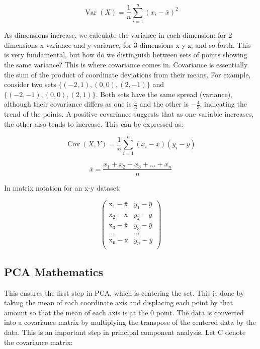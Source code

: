 \documentclass{article}
\begin{document}
\begin{equation*}
\operatorname{Var}(X) = \frac{1}{n} \sum_{i=1}^{n} (x_i - \bar{x})^2
\end{equation*}

As dimensions increase, we calculate the variance in each dimension: for 2 dimensions x-variance and y-variance, for 3 dimensions x-y-z, and so forth. This is very fundamental, but how do we distinguish between sets of points showing the same variance? This is where covariance comes in. Covariance is essentially the sum of the product of coordinate deviations from their means. For example, consider two sets $\{(-2,1),(0,0),(2,-1)\}$ and $\{(-2,-1),(0,0),(2,1)\}$. Both sets have the same spread (variance), although their covariance differs as one is $\frac{4}{3}$ and the other is $-\frac{4}{3}$, indicating the trend of the points. A positive covariance suggests that as one variable increases, the other also tends to increase. This can be expressed as:

\begin{equation*}
\operatorname{Cov}(X, Y) = \frac{1}{n} \sum_{i=1}^{n} (x_i - \bar{x})(y_i - \bar{y})
\end{equation*}

\begin{equation*}
\bar{x} = \frac{x_1 + x_2 + x_3 + \dots + x_n}{n}
\end{equation*}

In matrix notation for an x-y dataset:

\begin{equation*}
  \begin{pmatrix}
      \operatorname{x_1 - \bar{x}} & {y_1 - \bar{y}} \\
       \operatorname{x_2 - \bar{x}} & {y_2 - \bar{y}} \\
        \operatorname{x_3 - \bar{x}} & {y_3 - \bar{y}} \\
     \operatorname{...} & {...} \\
         \operatorname{x_n - \bar{x}} & {y_n - \bar{y}} \\
  \end{pmatrix}  
\end{equation*}

\subsection{PCA Mathematics}

This ensures the first step in PCA, which is centering the set. This is done by taking the mean of each coordinate axis and displacing each point by that amount so that the mean of each axis is at the 0 point. The data is converted into a covariance matrix by multiplying the transpose of the centered data by the data. This is an important step in principal component analysis. Let C denote the covariance matrix:
\end{document}
